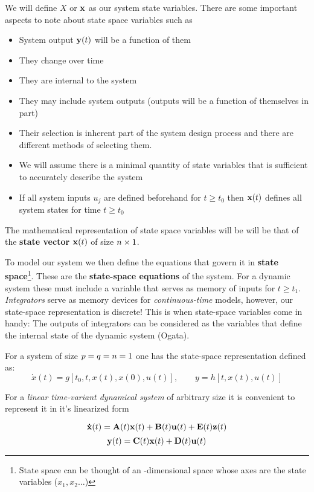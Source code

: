 \documentclass[11pt, a4paper, twoside, openright]{book}
\newcommand{\dimin}{\dimfont{p}}
\newcommand{\dimout}{\dimfont{q}}
\newcommand{\dimss}{\dimfont{n}}
\begin{document}
We will define \(X\) or \(\mathbf{x}\) as our system state variables. There are some important aspects to note about state space variables such as
\begin{itemize}
	\item System output \(\mathbf{y}(t)\) will be a function of them
	\item They change over time
	\item They are internal to the system
	\item They may include system outputs (outputs will be a function of themselves in part)
	\item Their selection is inherent part of the system design process and there are different methods of selecting them.
	\item We will assume there is a minimal quantity of state variables that is sufficient to accurately describe the system
	\item If all system inputs \(u_j\) are defined beforehand for \(t\geq t_0\) then \(\mathbf{x}(t)\) defines all system states for time \(t \geq t_0\)
\end{itemize}


The mathematical representation of state space variables will be will be that of the \textbf{state vector} \(\mathbf{x}(t)\) of size \(\dimss \times 1\).

To model our system we then define the equations that govern it in \textbf{state space}\footnote{State space can be thought of an \dimss -dimensional space whose axes are the state variables (\(x_1,x_2\ldots\))}. These are the \textbf{state-space equations} of the system. For a dynamic system these must include a variable that serves as memory of inputs for \(t \geq t_1\). \textit{Integrators} serve as memory devices for \textit{continuous-time} models, however, our state-space representation is discrete! This is when state-space variables come in handy: The outputs of integrators can be considered as the variables that define the internal state of the dynamic system (Ogata). 


For a system of size \(\dimin=\dimout=\dimss=1\) one has the state-space representation defined as:
\[
\dot{x}(t)=g\left[t_0,t,x(t),x(0),u(t)\right] ,\qquad y=h\left[t,x(t),u(t)\right]
\]

For a \textit{linear time-variant dynamical system} of arbitrary size it is convenient to represent it in it's linearized form

\begin{equation}
\mathbf{\dot{x}} (t) = \mathbf{A}(t) \mathbf{x}(t) + \mathbf{B}(t) \mathbf{u}(t) + \mathbf{E}(t) \mathbf{z}(t)
\end{equation}
\begin{equation}
\mathbf{y} (t) = \mathbf{C}(t) \mathbf{x}(t) + \mathbf{D}(t) \mathbf{u}(t)
\end{equation}
\end{document}
